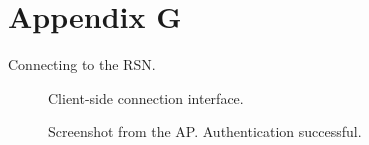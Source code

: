 \documentclass[a4paper,11pt]{article}
\begin{document}
\newpage

\section*{Appendix G} \label{sec:appendixg}

Connecting to the RSN.

\begin{figure}[h!]
\centering
{}
\caption{\label{fig:eapclient} Client-side connection interface.}
\end{figure}

\begin{figure}[h!]
\centering
{}
\caption{\label{fig:eap4way} Screenshot from the AP. Authentication successful.}
\end{figure}
\end{document}
